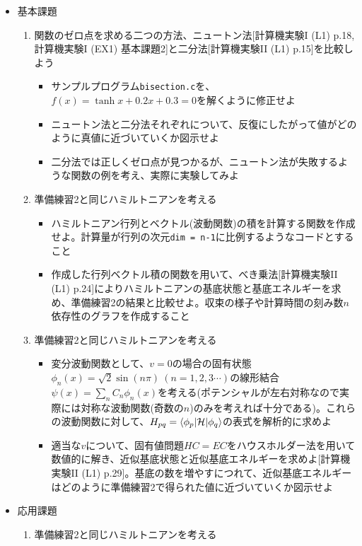 \documentclass[11pt]{jarticle}
\begin{document}
\begin{itemize}
\item 基本課題
  \begin{enumerate}
  \item 関数のゼロ点を求める二つの方法、ニュートン法[計算機実験I (L1) p.18, 計算機実験I (EX1) 基本課題2]と二分法[計算機実験II (L1) p.15]を比較しよう
    \begin{itemize}
    \item サンプルプログラム{\tt bisection.c}を、$f(x) = \tanh x+0.2x+0.3=0$を解くように修正せよ
    \item ニュートン法と二分法それぞれについて、反復にしたがって値がどのように真値に近づいていくか図示せよ
    \item 二分法では正しくゼロ点が見つかるが、ニュートン法が失敗するような関数の例を考え、実際に実験してみよ
    \end{itemize}
  \item 準備練習2と同じハミルトニアンを考える
    \begin{itemize}
      \item ハミルトニアン行列とベクトル(波動関数)の積を計算する関数を作成せよ。計算量が行列の次元{\tt dim = n-1}に比例するようなコードとすること
      \item 作成した行列ベクトル積の関数を用いて、べき乗法[計算機実験II (L1) p.24]によりハミルトニアンの基底状態と基底エネルギーを求め、準備練習2の結果と比較せよ。収束の様子や計算時間の刻み数$n$依存性のグラフを作成すること
    \end{itemize}
  \item 準備練習2と同じハミルトニアンを考える
    \begin{itemize}
    \item 変分波動関数として、$v=0$の場合の固有状態$\phi_n(x) = \sqrt{2} \sin(n \pi) \ (n=1,2,3\cdots)$の線形結合$\psi(x) = \sum_n C_n \phi_n(x)$を考える(ポテンシャルが左右対称なので実際には対称な波動関数(奇数の$n$)のみを考えれば十分である)。これらの波動関数に対して、$H_{pq} = \langle \phi_p | {\cal H} | \phi_q \rangle$の表式を解析的に求めよ
    \item 適当な$v$について、固有値問題$HC = EC$をハウスホルダー法を用いて数値的に解き、近似基底状態と近似基底エネルギーを求めよ[計算機実験II (L1) p.29]。基底の数を増やすにつれて、近似基底エネルギーはどのように準備練習2で得られた値に近づいていくか図示せよ
    \end{itemize}
  \end{enumerate}  
\item 応用課題
  \begin{enumerate}
  \item 準備練習2と同じハミルトニアンを考える

\end{enumerate}
\end{itemize}
\end{document}
